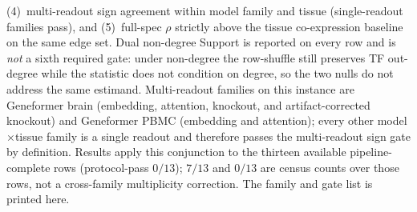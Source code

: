 \documentclass[fleqn,10pt,lineno]{wlpeerj}
\begin{document}
(4)~multi-readout sign agreement within model family and tissue (single-readout families pass), and
(5)~full-spec $\rho$ strictly above the tissue co-expression baseline on the same edge set.
Dual non-degree Support is reported on every row and is \emph{not} a sixth required gate: under
non-degree the row-shuffle still preserves TF out-degree while the statistic does not condition on
degree, so the two nulls do not address the same estimand. Multi-readout families on this instance
are Geneformer brain (embedding, attention, knockout, and artifact-corrected knockout) and
Geneformer PBMC (embedding and attention); every other model$\times$tissue family is a single
readout and therefore passes the multi-readout sign gate by definition. Results apply this
conjunction to the thirteen available pipeline-complete rows (protocol-pass $0/13$); $7/13$ and $0/13$
are census counts over those rows, not a cross-family multiplicity correction.
The family and gate list is printed here.
\end{document}
